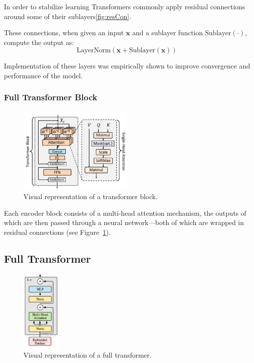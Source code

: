 \documentclass{pracalicmgr}
\begin{document}
In order to stabilize learning Transformers commonly apply residual connections around some of their sublayers\ref{fig:resCon}.

These connections, when given an input \( \mathbf{x} \) and a sublayer function \( \text{Sublayer}(\cdot) \), compute the output as:
\[
\text{LayerNorm}(\mathbf{x} + \text{Sublayer}(\mathbf{x}))
\]

Implementation of these layers was empirically shown to improve convergence and performance of the model.


\subsubsection{Full Transformer Block}

\begin{figure}[h]
    \centering
    \includegraphics[width=0.5\textwidth]{src/transformerBlockSingle.pdf}
    \caption{Visual representation of a transformer block. \cite{transformerBlockSingle}}
    \label{fig:transformerEncoder}
\end{figure}

Each encoder block consists of a multi-head attention mechanism, the outputs of which are then passed through a neural network—both of which are wrapped in residual connections (see Figure~\ref{fig:transformerEncoder}).

\subsection{Full Transformer} 

\begin{figure}[h]
    \centering
    \includegraphics[width=0.17\textwidth]{src/transformerEncoder.pdf}
    \caption{Visual representation of a full transformer. \cite{Vaswani2017Attention}}
    \label{fig:transformerFull}
\end{figure}
\end{document}

